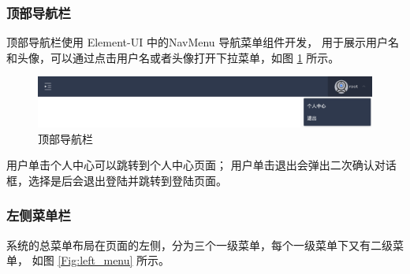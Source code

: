 \subsubsection{顶部导航栏}
顶部导航栏使用 Element-UI 中的NavMenu 导航菜单组件开发，
用于展示用户名和头像，可以通过点击用户名或者头像打开下拉菜单，如图 \ref{Fig:top} 所示。

\begin{figure}[ht]
    \centering
    \includegraphics[width=1\linewidth]{./Figure/IMG_top.png}
    \caption{顶部导航栏}\label{Fig:top}
\end{figure}

用户单击个人中心可以跳转到个人中心页面；
用户单击退出会弹出二次确认对话框，选择是后会退出登陆并跳转到登陆页面。

\newpage
\subsubsection{左侧菜单栏}
系统的总菜单布局在页面的左侧，分为三个一级菜单，每个一级菜单下又有二级菜单，
如图 \ref{Fig:left_menu} 所示。

